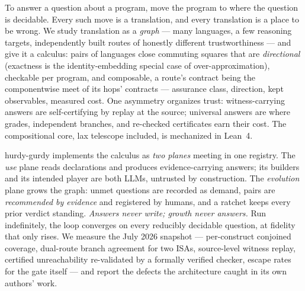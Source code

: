 
To answer a question about a program, move the program to where the
question is decidable. Every such move is a translation, and every
translation is a place to be wrong. We study translation as a
\emph{graph} --- many languages, a few reasoning targets, independently
built routes of honestly different trustworthiness --- and give it a
calculus: pairs of languages close commuting squares that are
\emph{directional} (exactness is the identity-embedding special case of
over-approximation), checkable per program, and composable, a route's
contract being the componentwise meet of its hops' contracts ---
assurance class,
direction, kept observables, measured cost. One asymmetry organizes
trust: witness-carrying answers are self-certifying by replay at the
source; universal answers are where grades, independent branches, and
re-checked certificates earn their cost. The compositional core, lax
telescope included, is mechanized in Lean~4.

hurdy-gurdy implements the calculus as \emph{two planes} meeting in one
registry. The \emph{use} plane reads declarations and produces
evidence-carrying answers; its builders and its intended player are
both LLMs, untrusted by construction. The \emph{evolution} plane grows
the graph: unmet questions are recorded as demand, pairs are
\emph{recommended by evidence} and registered by humans, and a ratchet
keeps every prior verdict standing. \emph{Answers never write; growth
never answers.} Run indefinitely, the loop converges on every reducibly
decidable question, at fidelity that only rises. We measure the July
2026 snapshot --- per-construct conjoined coverage, dual-route branch
agreement for two ISAs, source-level witness replay, certified
unreachability re-validated by a formally verified checker, escape
rates for the gate itself --- and report the defects the architecture
caught in its own authors' work.
